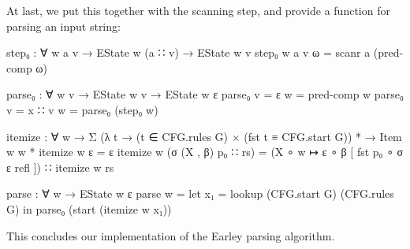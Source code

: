 		At last, we put this together with the scanning step, and provide a
		function for parsing an input string:

		\begin{code}
			  step₀ : ∀ {w a v} →
			    EState w (a ∷ v) →
			    EState w v
			  step₀ {w} {a} {v} ω = scanr a (pred-comp ω)

			  parse₀ : ∀ {w v} →
			     EState w v →
			     EState w ε
			  parse₀ {v = ε} w = pred-comp w
			  parse₀ {v = x ∷ v} w = parse₀ (step₀ w)

			  itemize : ∀ w →
			    Σ (λ t → (t ∈ CFG.rules G) × (fst t ≡ CFG.start G)) * →
			    Item w w *
			  itemize w ε = ε
			  itemize w (σ (X , β) p₀ ∷ rs) = (X ∘ w ↦ ε ∘ β [ fst p₀ ∘ σ ε refl ]) ∷ itemize w rs

			  parse : ∀ w → EState w ε
			  parse w =
			    let x₁ = lookup (CFG.start G) (CFG.rules G) in
			    parse₀ (start (itemize w x₁))
		\end{code}

		This concludes our implementation of the Earley parsing algorithm.

